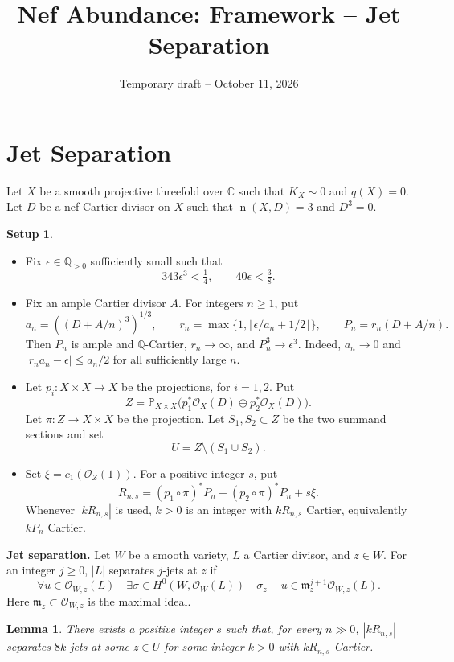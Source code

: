 \documentclass[12pt,a4paper,psamsfonts]{amsart}
\title{Nef Abundance: Framework -- Jet Separation}
\date{Temporary draft -- October 11, 2026}
\theoremstyle{definition}
\newtheorem*{setup}{Setup}
\theoremstyle{plain}
\newtheorem{lemma}{Lemma}[section]
\newcommand{\Q}{\mathbb Q}
\newcommand{\C}{\mathbb C}
\newcommand{\OO}{\mathcal O}
\newcommand{\nef}{\operatorname{n}}
\begin{document}
\maketitle

\section{Jet Separation}

Let $X$ be a smooth projective threefold over $\C$ such that
$K_X\sim0$ and $q(X)=0$. Let $D$ be a nef Cartier divisor on $X$
such that $\nef(X,D)=3$ and $D^3=0$.

\begin{setup}
\leavevmode
\begin{itemize}
\setlength{\itemsep}{2pt}
\setlength{\parsep}{0pt}
\item Fix $\epsilon\in\Q_{>0}$ sufficiently small such that
\[
 343\epsilon^3<\tfrac14,\qquad40\epsilon<\tfrac38.
\]
\item Fix an ample Cartier divisor $A$.
For integers $n\ge1$, put
\[
 a_n=((D+A/n)^3)^{1/3},\qquad
 r_n=\max\{1,\lfloor\epsilon/a_n+1/2\rfloor\},\qquad
 P_n=r_n(D+A/n).
\]
Then $P_n$ is ample and $\mathbb{Q}$-Cartier, $r_n\to\infty$, and
$P_n^3\to\epsilon^3$. Indeed, $a_n\to0$ and
$|r_na_n-\epsilon|\le a_n/2$ for all sufficiently large $n$.
\item Let $p_i:X\times X\to X$ be the projections, for $i=1,2$.
Put
\[
 Z=\mathbb P_{X\times X}
       \bigl(p_1^*\OO_X(D)\oplus p_2^*\OO_X(D)\bigr).
\]
Let $\pi:Z\to X\times X$ be the projection.
Let $S_1,S_2\subset Z$ be the two summand sections and set
\[
 U=Z\setminus(S_1\cup S_2).
\]
\item Set $\xi=c_1(\OO_Z(1))$. For a positive integer $s$, put
\[
 R_{n,s}=(p_1\circ\pi)^*P_n+(p_2\circ\pi)^*P_n+s\xi.
\]
Whenever $|kR_{n,s}|$ is used, $k>0$ is an integer with
$kR_{n,s}$ Cartier, equivalently $kP_n$ Cartier.
\end{itemize}

\end{setup}

\medskip
\noindent\textbf{Jet separation.}
Let $W$ be a smooth variety, $L$ a Cartier divisor, and $z\in W$.
For an integer $j\ge0$, $|L|$ separates $j$-jets at $z$ if
\[
 \forall u\in\OO_{W,z}(L)\quad
 \exists\sigma\in H^0(W,\OO_W(L))\quad
 \sigma_z-u\in\mathfrak m_z^{j+1}\OO_{W,z}(L).
\]
Here $\mathfrak m_z\subset\OO_{W,z}$ is the maximal ideal.

\begin{lemma}\label{lem:full-jets}
There exists a positive integer $s$ such that, for every $n\gg0$,
$|kR_{n,s}|$ separates $8k$-jets at some $z\in U$ for some
integer $k>0$ with $kR_{n,s}$ Cartier.
\end{lemma}
\end{document}
